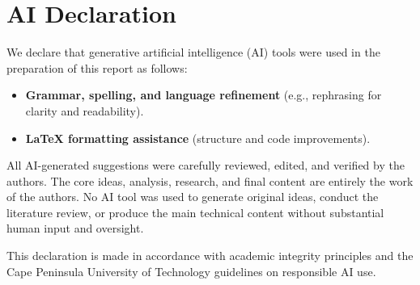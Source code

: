 
\chapter*{AI Declaration}

We declare that generative artificial intelligence (AI) tools were used in the preparation of this report as follows:

\begin{itemize}
    \item \textbf{Grammar, spelling, and language refinement} (e.g., rephrasing for clarity and readability).
    \item \textbf{LaTeX formatting assistance} (structure and code improvements).
\end{itemize}

All AI-generated suggestions were carefully reviewed, edited, and verified by the authors. The core ideas, analysis, research, and final content are entirely the work of the authors. No AI tool was used to generate original ideas, conduct the literature review, or produce the main technical content without substantial human input and oversight.

This declaration is made in accordance with academic integrity principles and the Cape Peninsula University of Technology guidelines on responsible AI use.

\vspace{10mm}

